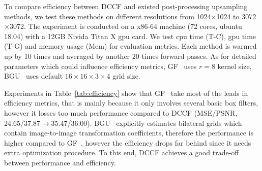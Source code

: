 \documentclass[runningheads]{llncs}
\begin{document}
To compare efficiency between DCCF and existed post-processing upsampling methods, we test these methods on different resolutions from 1024$\times$1024 to 3072$\times$3072.
The experiment is conducted on a x86-64 machine (72 cores, ubuntu 18.04) with a 12GB Nivida Titan X gpu card.
We test cpu time (T-C), gpu time (T-G) and memory usage (Mem) for evaluation metrics.
Each method is warmed up by 10 times and averaged by another 20 times forward passes.
As for detailed parameters which could influence efficiency metrics, GF~\cite{hekaiming2013GF} uses $r=8$ kernel size, BGU~\cite{chen2016bilateral} uses default $16\times16\times3\times4$ grid size.

Experiments in Table~\ref{tab:efficiency} show that GF~\cite{hekaiming2013GF} take most of the leads in efficiency metrics, that is mainly because it only involves several basic box filters, however it losses too much performance compared to DCCF (MSE/PSNR, 24.65/37.87$\rightarrow$35.47/36.00). 
BGU~\cite{chen2016bilateral} explicitly estimates bilateral grids which contain image-to-image transformation coefficients, therefore the performance is higher compared to GF~\cite{hekaiming2013GF}, however the efficiency drops far behind since it needs extra optimization procedure.
To this end, DCCF achieves a good trade-off between performance and efficiency.
\end{document}
